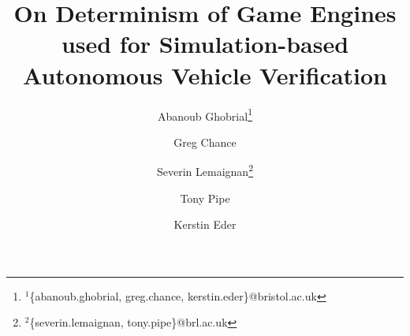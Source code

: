 \documentclass[letterpaper, 10 pt, journal, twoside]{IEEEtran}
\begin{document}
% 
% 
% 
% 
% 
% 
% 

\title{On Determinism of Game Engines used for Simulation-based Autonomous Vehicle Verification}
\author[1,3]{Abanoub Ghobrial\thanks{$^{1}${\footnotesize \{abanoub.ghobrial, greg.chance, kerstin.eder\}@bristol.ac.uk}}}
\author[1,3]{Greg Chance}
\author[2,3]{Severin Lemaignan\thanks{$^{2}${\footnotesize \{severin.lemaignan, tony.pipe\}@brl.ac.uk}}}
\author[2,3]{Tony Pipe}
\author[1,3]{Kerstin Eder}
\maketitle
\end{document}
